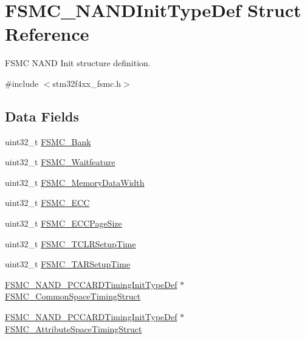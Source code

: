 \hypertarget{struct_f_s_m_c___n_a_n_d_init_type_def}{\section{F\-S\-M\-C\-\_\-\-N\-A\-N\-D\-Init\-Type\-Def Struct Reference}
\label{struct_f_s_m_c___n_a_n_d_init_type_def}
}


F\-S\-M\-C N\-A\-N\-D Init structure definition.  




{\ttfamily \#include $<$stm32f4xx\-\_\-fsmc.\-h$>$}

\subsection*{Data Fields}
\begin{DoxyCompactItemize}
\item 
uint32\-\_\-t \hyperlink{struct_f_s_m_c___n_a_n_d_init_type_def_a787e4c845195c81c7326893451a2fc6f}{F\-S\-M\-C\-\_\-\-Bank}
\item 
uint32\-\_\-t \hyperlink{struct_f_s_m_c___n_a_n_d_init_type_def_a9ecc2cc3ec6462a8a86e545c9b8ff3cf}{F\-S\-M\-C\-\_\-\-Waitfeature}
\item 
uint32\-\_\-t \hyperlink{struct_f_s_m_c___n_a_n_d_init_type_def_aa89fb8c812e5ef7800eef9574dcb972d}{F\-S\-M\-C\-\_\-\-Memory\-Data\-Width}
\item 
uint32\-\_\-t \hyperlink{struct_f_s_m_c___n_a_n_d_init_type_def_a55c67a186e64de7086510dca7538db2a}{F\-S\-M\-C\-\_\-\-E\-C\-C}
\item 
uint32\-\_\-t \hyperlink{struct_f_s_m_c___n_a_n_d_init_type_def_a725f883015c7b7a94917b12e6dc79ee2}{F\-S\-M\-C\-\_\-\-E\-C\-C\-Page\-Size}
\item 
uint32\-\_\-t \hyperlink{struct_f_s_m_c___n_a_n_d_init_type_def_ab9fd4e9d4db1fc098d5f4ccffb80bf61}{F\-S\-M\-C\-\_\-\-T\-C\-L\-R\-Setup\-Time}
\item 
uint32\-\_\-t \hyperlink{struct_f_s_m_c___n_a_n_d_init_type_def_ab1fc3b07b6286b4974690191231f2773}{F\-S\-M\-C\-\_\-\-T\-A\-R\-Setup\-Time}
\item 
\hyperlink{struct_f_s_m_c___n_a_n_d___p_c_c_a_r_d_timing_init_type_def}{F\-S\-M\-C\-\_\-\-N\-A\-N\-D\-\_\-\-P\-C\-C\-A\-R\-D\-Timing\-Init\-Type\-Def} $\ast$ \hyperlink{struct_f_s_m_c___n_a_n_d_init_type_def_aec43dfa3b0c0ef09b02ac1b27cac92c7}{F\-S\-M\-C\-\_\-\-Common\-Space\-Timing\-Struct}
\item 
\hyperlink{struct_f_s_m_c___n_a_n_d___p_c_c_a_r_d_timing_init_type_def}{F\-S\-M\-C\-\_\-\-N\-A\-N\-D\-\_\-\-P\-C\-C\-A\-R\-D\-Timing\-Init\-Type\-Def} $\ast$ \hyperlink{struct_f_s_m_c___n_a_n_d_init_type_def_a96d5a1d02a42f194b9d5ebaae46dd3d7}{F\-S\-M\-C\-\_\-\-Attribute\-Space\-Timing\-Struct}
\end{DoxyCompactItemize}


